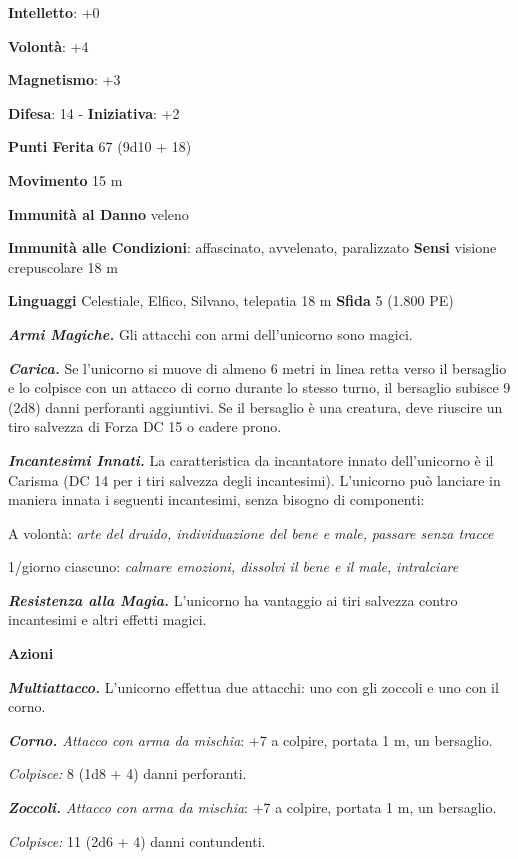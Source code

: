 \begin{multicols}{2}
\textbf{Intelletto}: +0

\textbf{Volontà}: +4

\textbf{Magnetismo}: +3

\textbf{Difesa}: 14 - \textbf{Iniziativa}: +2

\textbf{Punti Ferita} 67 (9d10 + 18)

\textbf{Movimento} 15 m

\textbf{Immunità al Danno} veleno

\textbf{Immunità alle Condizioni}: affascinato, avvelenato, paralizzato
\textbf{Sensi} visione crepuscolare 18 m

\textbf{Linguaggi} Celestiale, Elfico, Silvano, telepatia 18 m
\textbf{Sfida} 5 (1.800 PE)\smallskip

\emph{\textbf{Armi Magiche.}} Gli attacchi con armi dell'unicorno sono
magici.

\emph{\textbf{Carica.}} Se l'unicorno si muove di almeno 6 metri in
linea retta verso il bersaglio e lo colpisce con un attacco di corno
durante lo stesso turno, il bersaglio subisce 9 (2d8) danni perforanti
aggiuntivi. Se il bersaglio è una creatura, deve riuscire un tiro
salvezza di Forza DC 15 o cadere prono.

\emph{\textbf{Incantesimi Innati.}} La caratteristica da incantatore
innato dell'unicorno è il Carisma (DC 14 per i tiri salvezza degli
incantesimi). L'unicorno può lanciare in maniera innata i seguenti
incantesimi, senza bisogno di componenti:

A volontà: \emph{arte del druido, individuazione del bene e male,}
\emph{passare senza tracce}

1/giorno ciascuno: \emph{calmare emozioni, dissolvi il bene e il male,}
\emph{intralciare}

\emph{\textbf{Resistenza alla Magia.}} L'unicorno ha vantaggio ai tiri
salvezza contro incantesimi e altri effetti magici.

\smallskip\textbf{Azioni}

\emph{\textbf{Multiattacco.}} L'unicorno effettua due attacchi: uno con
gli zoccoli e uno con il corno.

\emph{\textbf{Corno.} Attacco con arma da mischia}: +7 a colpire,
portata 1 m, un bersaglio.

\emph{Colpisce:} 8 (1d8 + 4) danni perforanti.

\emph{\textbf{Zoccoli.} Attacco con arma da mischia}: +7 a colpire,
portata 1 m, un bersaglio.

\emph{Colpisce:} 11 (2d6 + 4) danni contundenti.


\end{multicols}
